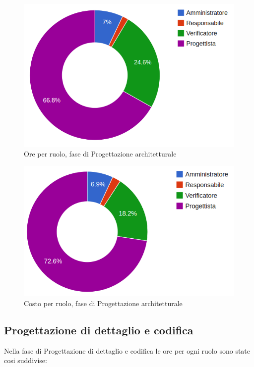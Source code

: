 \begin{figure}[H]
\centering
\includegraphics[scale=0.35]{5-2-1.png}
\caption{Ore per ruolo, fase di Progettazione architetturale\label{fig:nome}}
\end{figure}

\begin{figure}[H]
\centering
\includegraphics[scale=0.4]{5-2-2.png}
\caption{Costo per ruolo, fase di Progettazione architetturale\label{fig:nome}}
\end{figure}

\subsection{Progettazione di dettaglio e codifica}

Nella fase di Progettazione di dettaglio e codifica le ore per ogni ruolo sono state cosi suddivise:

